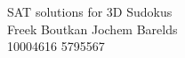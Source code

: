 \documentclass{article}
\begin{document}
\begin{center}
\Large{SAT solutions for 3D Sudokus}\\
\vspace{.5cm}
\small{Freek Boutkan \hspace{1.5cm} Jochem Barelds\\
10004616 \hspace{1.5cm} 5795567}
\end{center}












	



\printbibliography
\end{document}
